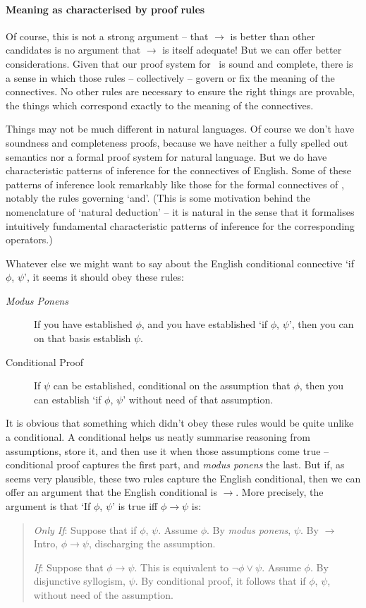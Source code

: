 \paragraph{Meaning as characterised by proof rules}
Of course, this is not a strong argument – that $\to$ is better than other candidates is no argument that $\to$ is itself adequate! But we can offer better considerations. Given that our proof system for \lone\ is sound and complete, there is a sense in which those rules – collectively – govern or fix the meaning of the connectives. No other rules are necessary to ensure the right things are provable, the things which correspond exactly to the meaning of the connectives.

Things may not be much different in natural languages. Of course we don't have soundness and completeness proofs, because we have neither a fully spelled out semantics nor a formal proof system for natural language. But we do have characteristic patterns of inference for the connectives of English. Some of these patterns of inference look remarkably like those for the formal connectives of \lone, notably the rules governing `and'. (This is some motivation behind the nomenclature of `natural deduction' – it is natural in the sense that it formalises intuitively fundamental characteristic patterns of inference for the corresponding operators.)

Whatever else we might want to say about the English conditional connective `if $\phi$, $\psi$', it seems it should obey these rules: \begin{description}
	\item [\emph{Modus Ponens}]  If you have established $\phi$, and you have established  `if $\phi$, $\psi$', then you can on that basis establish $\psi$.
	\item [Conditional Proof] If $\psi$ can be established, conditional on the assumption that $\phi$, then you can establish `if $\phi$, $\psi$' without need of that assumption. 
\end{description}
It is obvious that something which didn't obey these rules would be quite unlike a conditional. A conditional helps us neatly summarise reasoning from assumptions, store it, and then use it when those assumptions come true – conditional proof captures the first part, and \emph{modus ponens} the last.
But if, as seems very plausible, these two rules capture the English conditional, then we can offer an argument that the English conditional is $\to$. More precisely, the argument is that ‘If $\phi$, $\psi$’ is true iff $\phi \to \psi$ is:  \begin{quote}
	\emph{Only If}: Suppose that if $\phi$, $\psi$. Assume $\phi$. By \emph{modus ponens}, $\psi$. By $\to$Intro, $\phi\to\psi$, discharging the assumption.

\emph{If}: Suppose that $\phi \to \psi$. This is equivalent to $\neg \phi \vee \psi$. Assume $\phi$. By disjunctive syllogism, $\psi$. By conditional proof, it follows that if $\phi$, $\psi$, without need of the assumption.
\end{quote}

